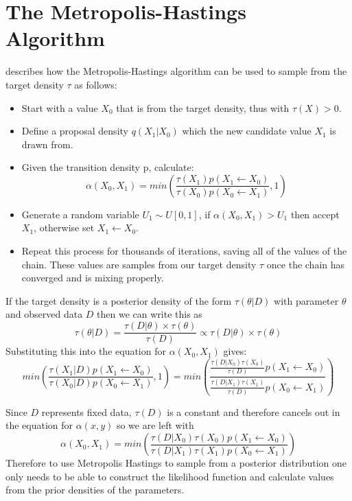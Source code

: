 \documentclass[11pt,a4paper]{report}
\begin{document}
\section{The Metropolis-Hastings Algorithm}
\citet{Voss14} describes how the Metropolis-Hastings algorithm can be used to sample from the target density $\tau$ as follows:
\begin{itemize}
\item Start with a value $X_0$ that is from the target density, thus with $\tau(X) > 0$.
\item Define a proposal density $q(X_1|X_0)$ which the new candidate value $X_1$ is drawn from.
\item Given the transition density p, calculate:
\begin{equation}
\alpha(X_0,X_1) = min\left(\frac{\tau(X_1)p(X_1 \leftarrow X_0)}{\tau(X_0)p(X_0 \leftarrow X_1)},1\right)
\end{equation}
\item Generate a random variable $U_1 \sim U[0,1]$, if $\alpha(X_0,X_1) > U_1$ then accept $X_1$, otherwise set $X_1 \leftarrow X_0$.
\item Repeat this process for thousands of iterations, saving all of the values of the chain. These values are samples from our target density $\tau$ once the chain has converged and is mixing properly.
\end{itemize}
If the target density is a posterior density of the form $\tau(\theta | D)$ with parameter $\theta$ and observed data $D$ then we can write this as
\begin{equation}
\tau(\theta | D) = \frac{\tau(D | \theta) \times \tau(\theta)}{\tau(D)} \propto \tau(D | \theta) \times \tau(\theta)
\end{equation}
Substituting this into the equation for $\alpha(X_0,X_1)$ gives:
\begin{equation}
min\left(\frac{\tau(X_1|D)p(X_1 \leftarrow X_0)}{\tau(X_0|D)p(X_0 \leftarrow X_1)},1\right)= min\left(\frac{\frac{\tau(D | X_0)\tau(X_0)}{\tau(D)}p(X_1 \leftarrow X_0)}{\frac{\tau(D | X_1)\tau(X_1)}{\tau(D)}p(X_0 \leftarrow X_1)}\right)
\end{equation}

Since $D$ represents fixed data, $\tau(D)$ is a constant and therefore cancels out in the equation for $\alpha(x,y)$ so we are left with
\begin{equation}
\alpha(X_0,X_1) = min\left(\frac{\tau(D | X_0)\tau(X_0)p(X_1 \leftarrow X_0)}{\tau(D | X_1)\tau(X_1)p(X_0 \leftarrow X_1)}\right)
\end{equation}
Therefore to use Metropolis Hastings to sample from a posterior distribution one only needs to be able to construct the likelihood function and calculate values from the prior densities of the parameters.
\end{document}

